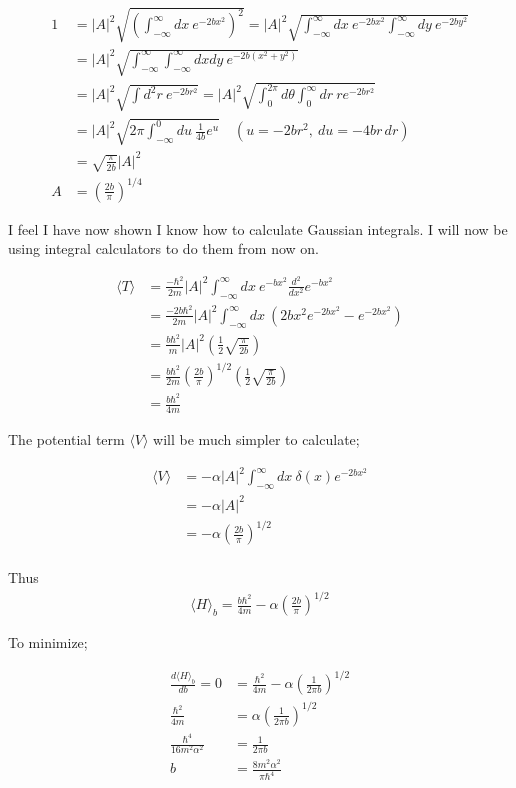 \documentclass{article}
\newcommand{\p}[1]{\left(#1\right)}
\newcommand{\braket}[1]{\langle#1\rangle}
\begin{document}
\begin{align*}
    1&=|A|^2\sqrt{\p{\int_{-\infty}^{\infty}dx\:e^{-2bx^2}}^2}=|A|^2\sqrt{\int_{-\infty}^{\infty}dx\:e^{-2bx^2}\int_{-\infty}^{\infty}dy\:e^{-2by^2}}\\[1em]
    &=|A|^2\sqrt{\int_{-\infty}^{\infty}\int_{-\infty}^{\infty}dxdy\:e^{-2b(x^2+y^2)}}\\[1em]
    &=|A|^2\sqrt{\int{}d^2r\:e^{-2br^2}}=|A|^2\sqrt{\int_{0}^{2\pi}d\theta\int_{0}^{\infty}dr\:re^{-2br^2}}\\[1em]
    &=|A|^2\sqrt{2\pi\int_{-\infty}^{0}du\:\frac{1}{4b}e^{u}} \quad \p{u=-2br^2,\:du=-4br\,dr}\\[1em]
    &=\sqrt{\frac{\pi}{2b}}|A|^2\\[1em]
    A&=\p{\frac{2b}{\pi}}^{1/4}
\end{align*}

I feel I have now shown I know how to calculate Gaussian integrals. I will now be using integral calculators to do them from now on.

\begin{align*}
    \braket{T}&=\frac{-\hbar^2}{2m}|A|^2\int_{-\infty}^{\infty}dx\:e^{-bx^2}\frac{d^2}{dx^2}e^{-bx^2}\\[1em]
    &=\frac{-2b\hbar^{2}}{2m}|A|^2\int_{-\infty}^{\infty}dx\:\p{2bx^2e^{-2bx^2}-e^{-2bx^2}}\\[1em]
    &=\frac{b\hbar^2}{m}|A|^2\p{\frac{1}{2}\sqrt{\frac{\pi}{2b}}}\\[1em]
    &=\frac{b\hbar^2}{2m}\p{\frac{2b}{\pi}}^{1/2}\p{\frac{1}{2}\sqrt{\frac{\pi}{2b}}}\\[1em]
    &=\frac{b\hbar^2}{4m}
\end{align*}

The potential term $\braket{V}$ will be much simpler to calculate;

\begin{align*}
    \braket{V}&=-\alpha|A|^{2}\int_{-\infty}^{\infty}dx\:\delta(x)e^{-2bx^2}\\[1em]
    &=-\alpha|A|^{2}\\[1em]
    &=-\alpha\p{\frac{2b}{\pi}}^{1/2}\\[1em]    
\end{align*}

Thus
\begin{align*}
    \braket{H}_{b}=\frac{b\hbar^2}{4m}-\alpha\p{\frac{2b}{\pi}}^{1/2}
\end{align*}

To minimize;

\begin{align*}
    \frac{d\braket{H}_b}{db}=0&=\frac{\hbar^2}{4m}-\alpha\p{\frac{1}{2\pi{b}}}^{1/2}\\[1em]
    \frac{\hbar^2}{4m}&=\alpha\p{\frac{1}{2\pi{b}}}^{1/2}\\[1em]
    \frac{\hbar^4}{16m^2\alpha^2}&=\frac{1}{2\pi{b}}\\[1em]
    b&=\frac{8m^2\alpha^2}{\pi\hbar^4}
\end{align*}
\end{document}
